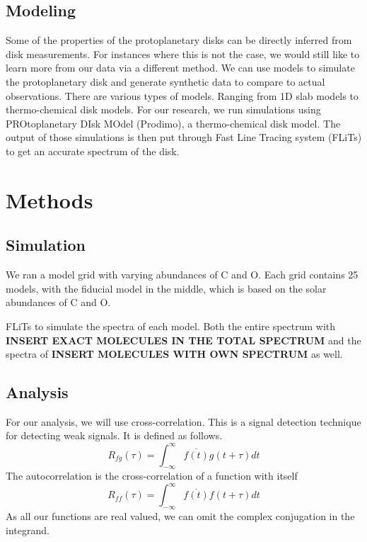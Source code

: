 \documentclass[twoside,single, authoryear, semicolon]{lion-msc}
\begin{document}
\section{Modeling}
Some of the properties of the protoplanetary disks can be directly inferred from disk measurements. For instances where this is not the case, we would still like to learn more from our data via a different method. We can use models to simulate the protoplanetary disk and generate synthetic data to compare to actual observations. There are various types of models. Ranging from 1D slab models to thermo-chemical disk models. For our research, we run simulations using PROtoplanetary DIsk MOdel (Prodimo), a thermo-chemical disk model. The output of those simulations is then put through Fast Line Tracing system (FLiTs) to get an accurate spectrum of the disk. 

\chapter{Methods}\label{Ch: Methods}
\section{Simulation}
We ran a model grid with varying abundances of C and O. Each grid contains 25 models, with the fiducial model in the middle, which is based on the solar abundances of C and O. 

FLiTs to simulate the spectra of each model. Both the entire spectrum with \textbf{INSERT EXACT MOLECULES IN THE TOTAL SPECTRUM} and the spectra of \textbf{INSERT MOLECULES WITH OWN SPECTRUM} as well. 

\section{Analysis}
For our analysis, we will use cross-correlation. This is a signal detection technique for detecting weak signals. It is defined as follows. 
\begin{equation}
    R_{fg}(\tau)=\int^\infty_{-\infty}\overline{f(t)}g(t+\tau)dt
\end{equation}
The autocorrelation is the cross-correlation of a function with itself
\begin{equation}
    R_{ff}(\tau)=\int^\infty_{-\infty}\overline{f(t)}f(t+\tau)dt
\end{equation}
As all our functions are real valued, we can omit the complex conjugation in the integrand.
\end{document}
